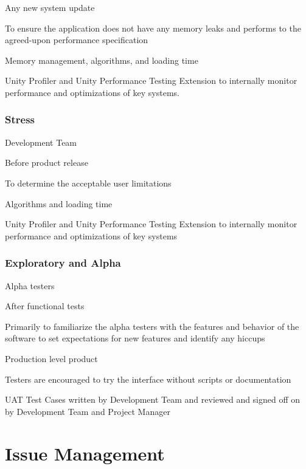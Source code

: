 \documentclass[letterpaper,10pt,english,openany,oneside]{sphinxmanual}
\let\sphinxpxdimen\pdfpxdimen\else\newdimen\sphinxpxdimen
\begin{document}
 Any new system update

 To ensure the application does not have any memory leaks and performs to the agreed-upon performance specification

 Memory management, algorithms, and loading time

 Unity Profiler and Unity Performance Testing Extension to internally monitor performance and optimizations of key systems.


\subsection{Stress}
\label{\detokenize{test_plan/strategy:stress}}
 Development Team

 Before product release

 To determine the acceptable user limitations

 Algorithms and loading time

 Unity Profiler and Unity Performance Testing Extension to internally monitor performance and optimizations of key systems


\subsection{Exploratory and Alpha}
\label{\detokenize{test_plan/strategy:exploratory-and-alpha}}
 Alpha testers

 After functional tests

 Primarily to familiarize the alpha testers with the features and behavior of the software to set expectations for new features and identify any hiccups

 Production level product

 Testers are encouraged to try the interface without scripts or documentation

 UAT Test Cases written by Development Team and reviewed and signed off on by Development Team and Project Manager


\chapter{Issue Management}
\label{\detokenize{test_plan/issue_management:issue-management}}\label{\detokenize{test_plan/issue_management:id1}}\label{\detokenize{test_plan/issue_management::doc}}
\noindent\sphinxincludegraphics[width=600\sphinxpxdimen]{{issue_lifecycle}.png}
\end{document}

